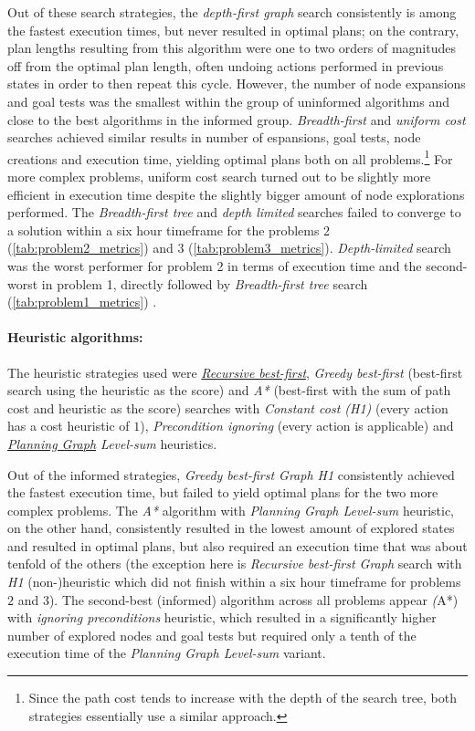 \documentclass[12pt, a4paper, oneside]{article}
\begin{document}
Out of these search strategies, the \textit{depth-first graph} search consistently
is among the fastest execution times, but never resulted in
optimal plans; on the contrary, plan lengths resulting from this algorithm
were one to two orders of magnitudes off from the optimal plan length,
often undoing actions performed in previous states in order to then repeat this cycle.
However, the number of node expansions and goal tests was the smallest
within the group of uninformed algorithms and close to the best algorithms
in the informed group.
\textit{Breadth-first} and \textit{uniform cost} searches achieved similar results in
number of espansions, goal tests, node creations and execution time,
yielding optimal plans both on all problems.\footnote{
Since the path cost tends to increase with the depth of the search tree, both
strategies essentially use a similar approach.}
For more complex problems, uniform cost search turned out to be slightly more efficient in execution time despite the slightly bigger amount of node explorations
performed.
The \textit{Breadth-first tree} and \textit{depth limited} searches failed to converge
to a solution within a six hour timeframe for the problems 2 (\cref{tab:problem2_metrics}) and 3 (\cref{tab:problem3_metrics}).
\textit{Depth-limited} search was the worst performer for problem 2 in terms of execution time and the second-worst in problem 1,
directly followed by \textit{Breadth-first tree} search (\cref{tab:problem1_metrics}) .

\paragraph{Heuristic algorithms:} The heuristic strategies used
were \href{https://github.com/sunsided/aima-pseudocode/blob/master/md/Recursive-Best-First-Search.md}{\textit{Recursive best-first}}, \textit{Greedy best-first} (best-first search using the heuristic as the score) and \textit{A*} (best-first with the sum of path cost and heuristic as the score) searches with 
\textit{Constant cost (H1)} (every action has a cost heuristic of $1$), \textit{Precondition ignoring} (every action is applicable) and \textit{\href{https://github.com/sunsided/aima-pseudocode/blob/master/md/GraphPlan.md}{Planning Graph} Level-sum} heuristics.

Out of the informed strategies, \textit{Greedy best-first Graph H1} consistently achieved
the fastest execution time, but failed to yield optimal plans for
the two more complex problems.
The \textit{A*} algorithm with \textit{Planning Graph Level-sum} heuristic,
on the other hand, consistently resulted in the lowest amount of explored
states and resulted in optimal plans, but also required an execution time
that was about tenfold of the others (the exception here is \textit{Recursive best-first Graph} search with \textit{H1} (non-)heuristic which did not finish within a six hour timeframe for problems $2$ and $3$).
The second-best (informed) algorithm across all problems appear \textit(A*) with \textit{ignoring preconditions} heuristic,
which resulted in a significantly higher number of explored nodes and goal tests
but required only a tenth of the execution time of the \textit{Planning Graph Level-sum} variant.
\end{document}
